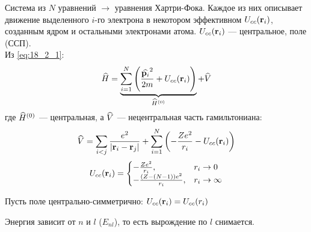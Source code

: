 Система из $N$ уравнений $\to$ уравнения Хартри-Фока. Каждое из них описывает движение выделенного $i$-го электрона в некотором эффективном  $U_{cc}(\mathbf{r}_i)$, созданным ядром и остальными электронами атома.
\noindent
$U_{cc}(\mathbf{r}_i)$ --- центральное,  поле (ССП).\\

Из \eqref{eq:18_2_1}:
$$
\widehat{H} = \underbrace{\sum_{i=1}^{N} \left ( {\frac{\widehat{\mathbf{p}_i}^2}{2m} + U_{cc}(\mathbf{r}_i)} \right )}_{\widehat{H}^{(0)}} + \widehat{V}
$$
где $\widehat{H}^{(0)}$ --- центральная, а $\widehat{V}$ --- нецентральная часть гамильтониана:
$$
\widehat{V} = \sum_{i<j} \frac{e^2}{\left\lvert{\mathbf{r}_i - \mathbf{r}_j}\right\rvert} + \sum_{i=1}^N \left ( {-\frac{Ze^2}{r_i} - U_{cc}(\mathbf{r}_i)} \right )
$$
$$
U_{cc}(\mathbf{r}_i) =
\begin{cases}
-\frac{Ze^2}{r_i},& r_i \to 0\\
-\frac{(Z-(N-1))e^2}{r_i},& r_i \to \infty\\
\end{cases}
$$

Пусть поле центрально-симметрично: $U_{cc}(\mathbf{r}_i) = U_{cc}(r_i)$

Энергия зависит от $n$ и $l$ ($E_{nl}$), то есть вырождение по $l$ снимается.
$$

$$